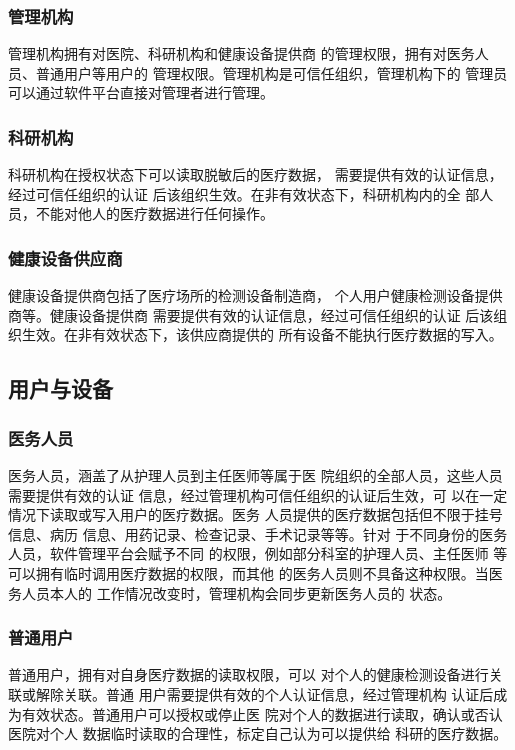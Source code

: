 \documentclass[UTF8]{ctexart}
\begin{document}
    \subsubsection{管理机构}
    \par
    管理机构拥有对医院、科研机构和健康设备提供商
    的管理权限，拥有对医务人员、普通用户等用户的
    管理权限。管理机构是可信任组织，管理机构下的
    管理员可以通过软件平台直接对管理者进行管理。
    \subsubsection{科研机构}
    \par
    科研机构在授权状态下可以读取脱敏后的医疗数据，
    需要提供有效的认证信息，经过可信任组织的认证
    后该组织生效。在非有效状态下，科研机构内的全
    部人员，不能对他人的医疗数据进行任何操作。
    \subsubsection{健康设备供应商}
    \par
    健康设备提供商包括了医疗场所的检测设备制造商，
    个人用户健康检测设备提供商等。健康设备提供商
    需要提供有效的认证信息，经过可信任组织的认证
    后该组织生效。在非有效状态下，该供应商提供的
    所有设备不能执行医疗数据的写入。
    \subsection{用户与设备}
    \subsubsection{医务人员}
    \par
    医务人员，涵盖了从护理人员到主任医师等属于医
    院组织的全部人员，这些人员需要提供有效的认证
    信息，经过管理机构可信任组织的认证后生效，可
    以在一定情况下读取或写入用户的医疗数据。医务
    人员提供的医疗数据包括但不限于挂号信息、病历
    信息、用药记录、检查记录、手术记录等等。针对
    于不同身份的医务人员，软件管理平台会赋予不同
    的权限，例如部分科室的护理人员、主任医师
    等可以拥有临时调用医疗数据的权限，而其他
    的医务人员则不具备这种权限。当医务人员本人的
    工作情况改变时，管理机构会同步更新医务人员的
    状态。
    \subsubsection{普通用户}
    \par
    普通用户，拥有对自身医疗数据的读取权限，可以
    对个人的健康检测设备进行关联或解除关联。普通
    用户需要提供有效的个人认证信息，经过管理机构
    认证后成为有效状态。普通用户可以授权或停止医
    院对个人的数据进行读取，确认或否认医院对个人
    数据临时读取的合理性，标定自己认为可以提供给
    科研的医疗数据。
\end{document}
